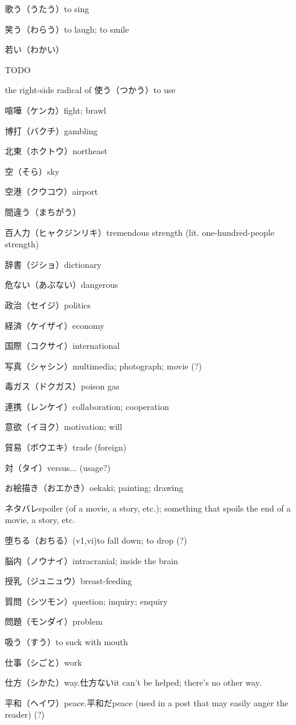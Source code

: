 歌う（うたう）to sing

笑う（わらう）to laugh; to smile

若い（わかい）

TODO

the right-side radical of 使う（つかう）to use

喧嘩（ケンカ）fight; brawl

博打（バクチ）gambling

北東（ホクトウ）northeast

空（そら）sky

空港（クウコウ）airport

間違う（まちがう）

百人力（ヒャクジンリキ）tremendous strength (lit. one-hundred-people strength)

辞書（ジショ）dictionary

危ない（あぶない）dangerous

政治（セイジ）politics

経済（ケイザイ）economy

国際（コクサイ）international

写真（シャシン）multimedia; photograph; movie (?)

毒ガス（ドクガス）poison gas

連携（レンケイ）collaboration; cooperation

意欲（イヨク）motivation; will

貿易（ボウエキ）trade (foreign)

対（タイ）versus... (usage?)

お絵描き（おエかき）oekaki; painting; drawing

ネタバレspoiler (of a movie, a story, etc.); something that spoils the end of a movie, a story, etc.

堕ちる（おちる）(v1,vi)to fall down; to drop (?)

脳内（ノウナイ）intracranial; inside the brain

授乳（ジュニュウ）breast-feeding

質問（シツモン）question; inquiry; enquiry

問題（モンダイ）problem

吸う（すう）to suck with mouth

仕事（シごと）work

仕方（シかた）way.仕方ないit can't be helped; there's no other way.

平和（ヘイワ）peace.平和だpeace (used in a post that may easily anger the reader) (?)

